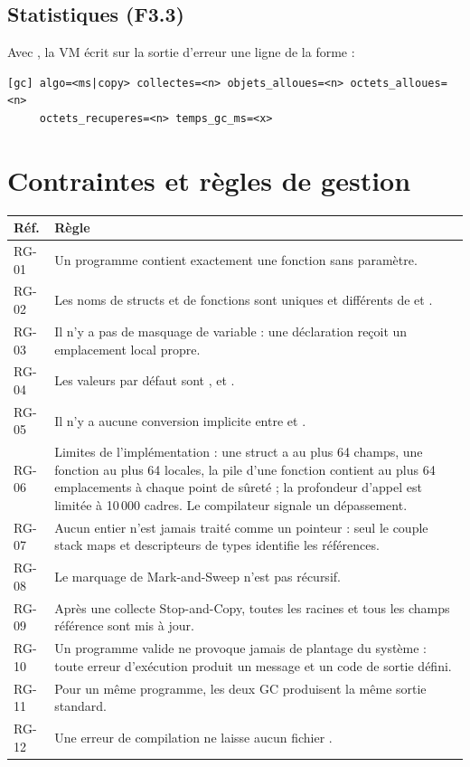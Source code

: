 \documentclass[11pt,a4paper]{article}
\newcommand{\code}[1]{\texttt{\detokenize{#1}}}
\begin{document}
\subsection{Statistiques (F3.3)}
Avec \code{--gc-stats}, la VM écrit sur la sortie d'erreur une ligne de la forme :

\begin{lstlisting}
[gc] algo=<ms|copy> collectes=<n> objets_alloues=<n> octets_alloues=<n>
     octets_recuperes=<n> temps_gc_ms=<x>
\end{lstlisting}

\section{Contraintes et règles de gestion}

\begin{longtable}{@{}p{} p{}@{}}
\toprule
\textbf{Réf.} & \textbf{Règle} \\
\midrule
\endhead
RG-01 & Un programme contient exactement une fonction \code{main(): int} sans paramètre. \\
RG-02 & Les noms de structs et de fonctions sont uniques et différents de \code{int} et \code{bool}. \\
RG-03 & Il n'y a pas de masquage de variable : une déclaration reçoit un emplacement local propre. \\
RG-04 & Les valeurs par défaut sont \code{0}, \code{false} et \code{null}. \\
RG-05 & Il n'y a aucune conversion implicite entre \code{int} et \code{bool}. \\
RG-06 & Limites de l'implémentation : une struct a au plus 64 champs, une fonction au plus 64 locales, la pile d'une fonction contient au plus 64 emplacements à chaque point de sûreté ; la profondeur d'appel est limitée à 10\,000 cadres. Le compilateur signale un dépassement. \\
RG-07 & Aucun entier n'est jamais traité comme un pointeur : seul le couple stack maps et descripteurs de types identifie les références. \\
RG-08 & Le marquage de Mark-and-Sweep n'est pas récursif. \\
RG-09 & Après une collecte Stop-and-Copy, toutes les racines et tous les champs référence sont mis à jour. \\
RG-10 & Un programme valide ne provoque jamais de plantage du système : toute erreur d'exécution produit un message et un code de sortie défini. \\
RG-11 & Pour un même programme, les deux GC produisent la même sortie standard. \\
RG-12 & Une erreur de compilation ne laisse aucun fichier \code{.tbc}. \\
\bottomrule
\end{longtable}
\end{document}
